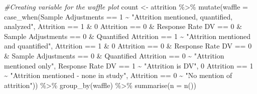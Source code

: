 \documentclass[
]{article}
\newenvironment{Shaded}{\begin{snugshade}}{\end{snugshade}}
\newcommand{\AttributeTok}[1]{\textcolor[rgb]{0.77,0.63,0.00}{#1}}
\newcommand{\CommentTok}[1]{\textcolor[rgb]{0.56,0.35,0.01}{\textit{#1}}}
\newcommand{\DecValTok}[1]{\textcolor[rgb]{0.00,0.00,0.81}{#1}}
\newcommand{\FunctionTok}[1]{\textcolor[rgb]{0.00,0.00,0.00}{#1}}
\newcommand{\NormalTok}[1]{#1}
\newcommand{\OtherTok}[1]{\textcolor[rgb]{0.56,0.35,0.01}{#1}}
\newcommand{\SpecialCharTok}[1]{\textcolor[rgb]{0.00,0.00,0.00}{#1}}
\newcommand{\StringTok}[1]{\textcolor[rgb]{0.31,0.60,0.02}{#1}}
\begin{document}
\begin{Shaded}
\begin{Highlighting}[]
\CommentTok{\#Creating variable for the waffle plot}
\NormalTok{count }\OtherTok{\textless{}{-}}\NormalTok{ attrition }\SpecialCharTok{\%\textgreater{}\%} 
  \FunctionTok{mutate}\NormalTok{(}\AttributeTok{waffle =} \FunctionTok{case\_when}\NormalTok{(}\StringTok{\textasciigrave{}}\AttributeTok{Sample Adjustments}\StringTok{\textasciigrave{}} \SpecialCharTok{==} \DecValTok{1} \SpecialCharTok{\textasciitilde{}} \StringTok{"Attrition mentioned, quantified, analyzed"}\NormalTok{,}
\NormalTok{                            Attrition }\SpecialCharTok{==} \DecValTok{1} \SpecialCharTok{\&} \StringTok{\textasciigrave{}}\AttributeTok{0 Attrition}\StringTok{\textasciigrave{}} \SpecialCharTok{==} \DecValTok{0} \SpecialCharTok{\&} \StringTok{\textasciigrave{}}\AttributeTok{Response Rate DV}\StringTok{\textasciigrave{}} \SpecialCharTok{==} \DecValTok{0} \SpecialCharTok{\&} \StringTok{\textasciigrave{}}\AttributeTok{Sample Adjustments}\StringTok{\textasciigrave{}} \SpecialCharTok{==} \DecValTok{0} \SpecialCharTok{\&} \StringTok{\textasciigrave{}}\AttributeTok{Quantified Attrition}\StringTok{\textasciigrave{}} \SpecialCharTok{==} \DecValTok{1} \SpecialCharTok{\textasciitilde{}} \StringTok{"Attrition mentioned and quantified"}\NormalTok{,}
\NormalTok{                            Attrition }\SpecialCharTok{==} \DecValTok{1} \SpecialCharTok{\&} \StringTok{\textasciigrave{}}\AttributeTok{0 Attrition}\StringTok{\textasciigrave{}} \SpecialCharTok{==} \DecValTok{0} \SpecialCharTok{\&} \StringTok{\textasciigrave{}}\AttributeTok{Response Rate DV}\StringTok{\textasciigrave{}} \SpecialCharTok{==} \DecValTok{0} \SpecialCharTok{\&} \StringTok{\textasciigrave{}}\AttributeTok{Sample Adjustments}\StringTok{\textasciigrave{}} \SpecialCharTok{==} \DecValTok{0} \SpecialCharTok{\&} \StringTok{\textasciigrave{}}\AttributeTok{Quantified Attrition}\StringTok{\textasciigrave{}} \SpecialCharTok{==} \DecValTok{0} \SpecialCharTok{\textasciitilde{}} \StringTok{"Attrition mentioned only"}\NormalTok{,}
                            \StringTok{\textasciigrave{}}\AttributeTok{Response Rate DV}\StringTok{\textasciigrave{}} \SpecialCharTok{==} \DecValTok{1} \SpecialCharTok{\textasciitilde{}} \StringTok{"Attrition is DV"}\NormalTok{,}
                            \StringTok{\textasciigrave{}}\AttributeTok{0 Attrition}\StringTok{\textasciigrave{}} \SpecialCharTok{==} \DecValTok{1} \SpecialCharTok{\textasciitilde{}} \StringTok{"Attrition mentioned {-} none in study"}\NormalTok{,}
\NormalTok{                            Attrition }\SpecialCharTok{==} \DecValTok{0} \SpecialCharTok{\textasciitilde{}} \StringTok{"No mention of attrition"}\NormalTok{)) }\SpecialCharTok{\%\textgreater{}\%} 
  \FunctionTok{group\_by}\NormalTok{(waffle) }\SpecialCharTok{\%\textgreater{}\%}
  \FunctionTok{summarise}\NormalTok{(}\AttributeTok{n =} \FunctionTok{n}\NormalTok{())}


\end{Highlighting}
\end{Shaded}
\end{document}
